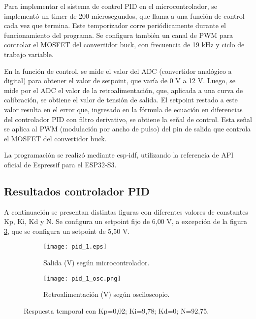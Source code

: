 Para implementar el sistema de control PID en el microcontrolador, se implementó un timer de 200 microsegundos,
que llama a una función de control cada vez que termina. Este temporizador corre periódicamente durante el funcionamiento
del programa. Se configura también un canal de PWM para controlar el MOSFET del convertidor buck, con frecuencia de 19 kHz
y ciclo de trabajo variable.

En la función de control, se mide el valor del ADC (convertidor analógico a digital) para obtener el
valor de setpoint, que varía de 0 V a 12 V. Luego, se mide por el ADC el valor de la retroalimentación, que, aplicada
a una curva de calibración, se obtiene el valor de tensión de salida. El setpoint restado a este valor resulta en
el error que, ingresado en la fórmula de ecuación en diferencias del controlador PID con filtro derivativo, se obtiene
la señal de control. Esta señal se aplica al PWM (modulación por ancho de pulso) del pin de salida que controla
el MOSFET del convertidor buck.

La programación se realizó mediante esp-idf, utilizando la referencia de API oficial de Espressif para el ESP32-S3. \parencite{ESPIDF}

\vspace{-0.5cm}
\subsection{\textbf{Resultados controlador PID}}
\vspace{-0.5cm}

A continuación se presentan distintas figuras con diferentes valores de constantes Kp, Ki, Kd y N. Se configura
un setpoint fijo de 6,00 V, a excepción de la figura \ref{fig:pid1}, que se configura un setpoint de 5,50 V.

\begin{figure}[H]
    \centering

    \begin{subfigure}[b]{0.49\textwidth}
        \centering
        \texttt{[image: pid\_1.eps]}
        \caption{Salida (V) según microcontrolador.}
        \label{fig:pid1_micro}
    \end{subfigure}
    \begin{subfigure}[b]{0.49\textwidth}
        \centering
        \texttt{[image: pid\_1\_osc.png]}
        \caption{Retroalimentación (V) según osciloscopio.}
        \label{fig:pid1_osciloscopio}
    \end{subfigure}

    \vspace{-0.25cm}
    \caption{Respuesta temporal con Kp=0,02; Ki=9,78; Kd=0; N=92,75.}
    \label{fig:pid1}
\end{figure}
\vspace{-0.5cm}

